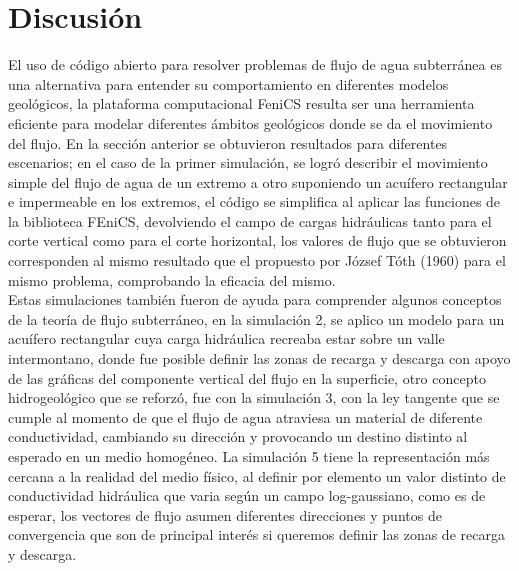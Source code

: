 \chapter*{Discusión}

El uso de código abierto para resolver problemas de flujo de agua subterránea es una alternativa para entender su comportamiento en diferentes modelos geológicos, la plataforma computacional FeniCS resulta ser una herramienta eficiente para modelar diferentes ámbitos geológicos donde se da el movimiento del flujo. En la sección anterior se obtuvieron resultados para diferentes escenarios; en el caso de la primer simulación, se logró describir el movimiento simple del flujo de agua de un extremo a otro suponiendo un acuífero rectangular e impermeable en los extremos, el código se simplifica al aplicar las funciones de la biblioteca FEniCS, devolviendo el campo de cargas hidráulicas tanto para el corte vertical como para el corte horizontal, los valores de flujo que se obtuvieron corresponden al mismo resultado que el  propuesto por József Tóth (1960) para el mismo problema, comprobando la eficacia del mismo.
\\

Estas simulaciones también fueron de ayuda para comprender algunos conceptos de la teoría de flujo subterráneo, en la simulación 2, se aplico un modelo para un acuífero rectangular cuya carga hidráulica recreaba estar sobre un valle intermontano, donde fue posible definir las zonas de recarga y descarga con apoyo de las gráficas del componente vertical del flujo en la superficie, otro concepto hidrogeológico que se reforzó, fue con la simulación 3, con la ley tangente que se cumple al momento de que el flujo de agua atraviesa un material de diferente conductividad, cambiando su dirección y provocando un destino distinto al esperado en un medio homogéneo. La simulación 5 tiene la representación más cercana a la realidad del medio físico, al definir por elemento un valor distinto de conductividad hidráulica que varia según un campo log-gaussiano, como es de esperar, los vectores de flujo asumen diferentes direcciones y puntos de convergencia que son de principal interés si queremos definir las zonas de recarga y descarga.    
\\


